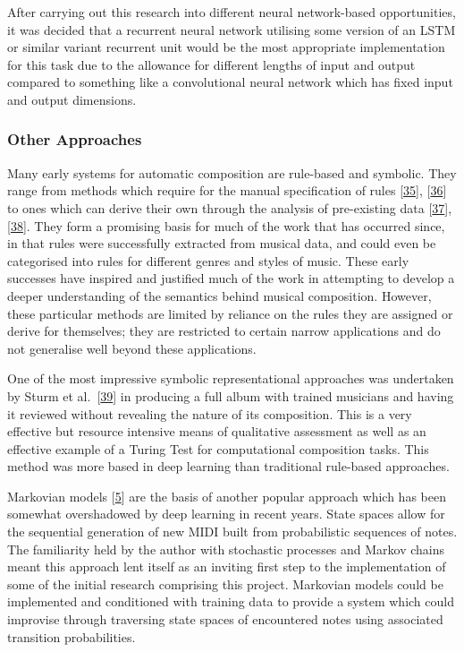 \documentclass[12pt,]{article}
\begin{document}
After carrying out this research into different neural network-based
opportunities, it was decided that a recurrent neural network utilising
some version of an LSTM or similar variant recurrent unit would be the
most appropriate implementation for this task due to the allowance for
different lengths of input and output compared to something like a
convolutional neural network which has fixed input and output
dimensions.

\hypertarget{other-approaches}{%
\subsubsection{Other Approaches}\label{other-approaches}}

Many early systems for automatic composition are rule-based and
symbolic. They range from methods which require for the manual
specification of rules
{[}\protect\hyperlink{ref-ebciouglu1988expert}{35}{]},
{[}\protect\hyperlink{ref-cruz1998learning}{36}{]} to ones which can
derive their own through the analysis of pre-existing data
{[}\protect\hyperlink{ref-cope1996experiments}{37}{]},
{[}\protect\hyperlink{ref-spangler1998bach}{38}{]}. They form a
promising basis for much of the work that has occurred since, in that
rules were successfully extracted from musical data, and could even be
categorised into rules for different genres and styles of music. These
early successes have inspired and justified much of the work in
attempting to develop a deeper understanding of the semantics behind
musical composition. However, these particular methods are limited by
reliance on the rules they are assigned or derive for themselves; they
are restricted to certain narrow applications and do not generalise well
beyond these applications.

One of the most impressive symbolic representational approaches was
undertaken by Sturm et
al.~{[}\protect\hyperlink{ref-sturm2018let}{39}{]} in producing a full
album with trained musicians and having it reviewed without revealing
the nature of its composition. This is a very effective but resource
intensive means of qualitative assessment as well as an effective
example of a Turing Test for computational composition tasks. This
method was more based in deep learning than traditional rule-based
approaches.

Markovian models {[}\protect\hyperlink{ref-luque2009stochastic}{5}{]}
are the basis of another popular approach which has been somewhat
overshadowed by deep learning in recent years. State spaces allow for
the sequential generation of new MIDI built from probabilistic sequences
of notes. The familiarity held by the author with stochastic processes
and Markov chains meant this approach lent itself as an inviting first
step to the implementation of some of the initial research comprising
this project. Markovian models could be implemented and conditioned with
training data to provide a system which could improvise through
traversing state spaces of encountered notes using associated transition
probabilities.
\end{document}
